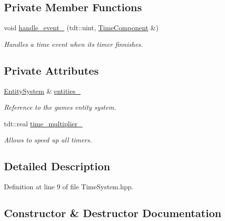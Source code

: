 \subsection*{Private Member Functions}
\begin{DoxyCompactItemize}
\item 
void \hyperlink{class_time_system_a6020adad2e06402466d59f1ae4209290}{handle\+\_\+event\+\_\+} (tdt\+::uint, \hyperlink{struct_time_component}{Time\+Component} \&)
\begin{DoxyCompactList}\small\item\em Handles a time event when it\textquotesingle{}s timer finnishes. \end{DoxyCompactList}\end{DoxyCompactItemize}
\subsection*{Private Attributes}
\begin{DoxyCompactItemize}
\item 
\hyperlink{class_entity_system}{Entity\+System} \& \hyperlink{class_time_system_abd970f32a5cb10d79d211e0ecdd788a3}{entities\+\_\+}
\begin{DoxyCompactList}\small\item\em Reference to the game\textquotesingle{}s entity system. \end{DoxyCompactList}\item 
tdt\+::real \hyperlink{class_time_system_a4477b8cfae0717af23decf2e90359dad}{time\+\_\+multiplier\+\_\+}
\begin{DoxyCompactList}\small\item\em Allows to speed up all timers. \end{DoxyCompactList}\end{DoxyCompactItemize}


\subsection{Detailed Description}


Definition at line 9 of file Time\+System.\+hpp.



\subsection{Constructor \& Destructor Documentation}
